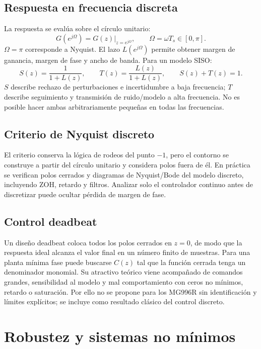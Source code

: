 \documentclass[11pt,letterpaper]{article}
\begin{document}
\subsection{Respuesta en frecuencia discreta}
La respuesta se evalúa sobre el círculo unitario:
\begin{equation}
 G(e^{j\Omega})=G(z)|_{z=e^{j\Omega}},\qquad
 \Omega=\omega T_s\in[0,\pi].
\end{equation}
$\Omega=\pi$ corresponde a Nyquist. El lazo
$L(e^{j\Omega})$ permite obtener margen de ganancia, margen de fase y ancho de
banda. Para un modelo SISO:
\begin{equation}
 S(z)=\frac{1}{1+L(z)},\qquad
 T(z)=\frac{L(z)}{1+L(z)},\qquad S(z)+T(z)=1.
\end{equation}
$S$ describe rechazo de perturbaciones e incertidumbre a baja frecuencia;
$T$ describe seguimiento y transmisión de ruido/modelo a alta frecuencia. No
es posible hacer ambas arbitrariamente pequeñas en todas las frecuencias.

\subsection{Criterio de Nyquist discreto}
El criterio conserva la lógica de rodeos del punto $-1$, pero el contorno se
construye a partir del círculo unitario y considera polos fuera de él. En
práctica se verifican polos cerrados y diagramas de Nyquist/Bode del modelo
discreto, incluyendo ZOH, retardo y filtros. Analizar solo el controlador
continuo antes de discretizar puede ocultar pérdida de margen de fase.

\subsection{Control deadbeat}
Un diseño deadbeat coloca todos los polos cerrados en $z=0$, de modo que la
respuesta ideal alcanza el valor final en un número finito de muestras. Para
una planta mínima fase puede buscarse $C(z)$ tal que la función cerrada tenga
un denominador monomial. Su atractivo teórico viene acompañado de comandos
grandes, sensibilidad al modelo y mal comportamiento con ceros no mínimos,
retardo o saturación. Por ello no se propone para los MG996R sin identificación
y límites explícitos; se incluye como resultado clásico del control discreto.

\section{Robustez y sistemas no mínimos}
\end{document}
